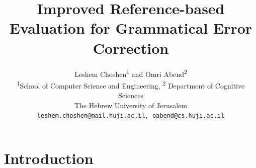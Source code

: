 \documentclass[english]{article}
\begin{document}
	
	\title{Improved Reference-based Evaluation for Grammatical Error Correction}
	
	\author{
		Leshem Choshen\textsuperscript{1} and Omri Abend\textsuperscript{2} \\
		\textsuperscript{1}School of Computer Science and Engineering,
                \textsuperscript{2} Department of Cognitive Sciences \\
		The Hebrew University of Jerusalem \\
		\texttt{leshem.choshen@mail.huji.ac.il, oabend@cs.huji.ac.il}\\
	}
	

\maketitle

\begin{abstract}
	
\end{abstract}

\section{Introduction}



\end{document}
